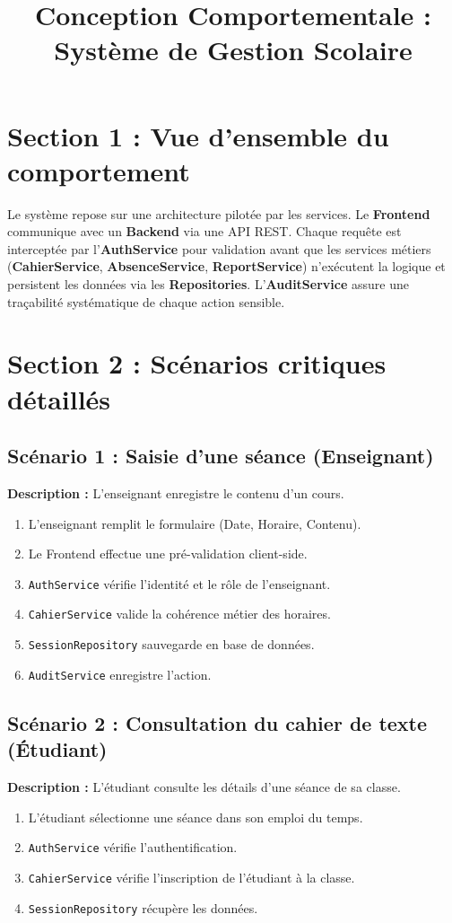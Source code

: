 \documentclass[12pt,a4paper]{article}
\title{Conception Comportementale : Système de Gestion Scolaire}
\date{}
\begin{document}
\maketitle

\section{Section 1 : Vue d’ensemble du comportement}
Le système repose sur une architecture pilotée par les services. Le \textbf{Frontend} communique avec un \textbf{Backend} via une API REST. Chaque requête est interceptée par l'\textbf{AuthService} pour validation avant que les services métiers (\textbf{CahierService}, \textbf{AbsenceService}, \textbf{ReportService}) n'exécutent la logique et persistent les données via les \textbf{Repositories}. L'\textbf{AuditService} assure une traçabilité systématique de chaque action sensible.

\section{Section 2 : Scénarios critiques détaillés}

\subsection{Scénario 1 : Saisie d’une séance (Enseignant)}
\textbf{Description :} L'enseignant enregistre le contenu d'un cours.
\begin{enumerate}
    \item L'enseignant remplit le formulaire (Date, Horaire, Contenu).
    \item Le Frontend effectue une pré-validation client-side.
    \item \texttt{AuthService} vérifie l'identité et le rôle de l'enseignant.
    \item \texttt{CahierService} valide la cohérence métier des horaires.
    \item \texttt{SessionRepository} sauvegarde en base de données.
    \item \texttt{AuditService} enregistre l'action.
\end{enumerate}

\subsection{Scénario 2 : Consultation du cahier de texte (Étudiant)}
\textbf{Description :} L'étudiant consulte les détails d'une séance de sa classe.
\begin{enumerate}
    \item L'étudiant sélectionne une séance dans son emploi du temps.
    \item \texttt{AuthService} vérifie l'authentification.
    \item \texttt{CahierService} vérifie l'inscription de l'étudiant à la classe.
    \item \texttt{SessionRepository} récupère les données.
\end{enumerate}
\end{document}
